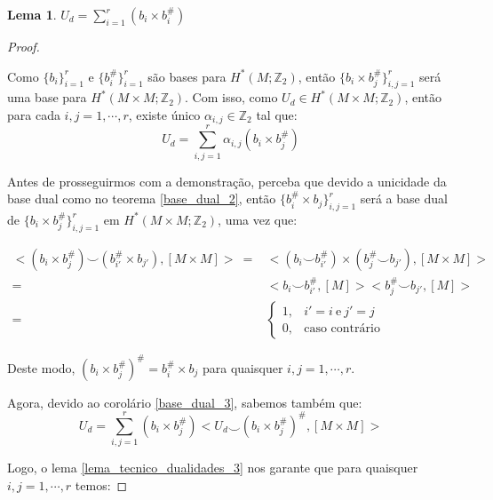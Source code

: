 \documentclass[12pt,oneside]{book} %
\newtheorem{lem}    {\hspace{0.5cm}Lema}[chapter]
\newcommand{\ds}{\displaystyle}
\newcommand{\Z}{\mathbb{Z}}
\newcommand{\ccup}{\smile}
\begin{document}
\begin{lem}\label{u_base_dual}
	$U_{d}=\ds\sum_{i=1}^{r}(b_{i}\times b_{i}^{\#})$
\end{lem}
\begin{proof}
	
	\
	
	\par Como $\{b_{i}\}_{i=1}^{r}$ e $\{b^{\#}_{i}\}_{i=1}^{r}$ são bases para $H^{*}(M;\Z_{2})$, então $\{b_{i}\times b_{j}^{\#}\}_{i,j=1}^{r}$ será uma base para $H^{*}(M\times M;\Z_{2})$. Com isso, como $U_{d}\in H^{*}(M\times M;\Z_{2})$, então para cada $i,j=1,\cdots,r$, existe único $\alpha_{i,j}\in\Z_{2}$ tal que:
	$$ U_{d}=\ds\sum_{i,j=1}^{r}\alpha_{i,j}(b_{i}\times b_{j}^{\#}) $$
	
	\par Antes de prosseguirmos com a demonstração, perceba que devido a unicidade da base dual como no teorema \ref{base_dual_2}, então $\{b^{\#}_{i}\times b_{j}\}_{i,j=1}^{r}$ será a base dual de $\{b_{i}\times b_{j}^{\#}\}_{i,j=1}^{r}$ em $H^{*}(M\times M;\Z_{2})$, uma vez que: \newline
	
	$ \begin{array}{rl}
		<(b_{i}\times b_{j}^{\#})\ccup (b_{i'}^{\#}\times b_{j'}),[M\times M]> \ = & <(b_{i}\ccup b_{i'}^{\#})\times (b_{j}^{\#}\ccup b_{j'}),[M\times M]> \\
		= & <b_{i}\ccup b_{i'}^{\#},[M]><b_{j}^{\#}\ccup b_{j'},[M]> \\
		= & \left\{ \begin{array}{cl}
			1, & i'=i \ \mbox{e} \ j'=j \\
			0, & \mbox{caso contrário}
		\end{array} \right.
	\end{array} $\newline
	
	\par Deste modo, $(b_{i}\times b_{j}^{\#})^{\#}=b_{i}^{\#}\times b_{j}$ para quaisquer $i,j=1,\cdots,r$.
	
	\par Agora, devido ao corolário \ref{base_dual_3}, sabemos também que:
	$$ U_{d}=\ds\sum_{i,j=1}^{r}(b_{i}\times b_{j}^{\#})<U_{d}\ccup (b_{i}\times b_{j}^{\#})^{\#},[M\times M]> $$
	
	\par Logo, o lema \ref{lema_tecnico_dualidades_3} nos garante que para quaisquer $i,j=1,\cdots,r$ temos:\newline
	

\end{proof}
\end{document}
